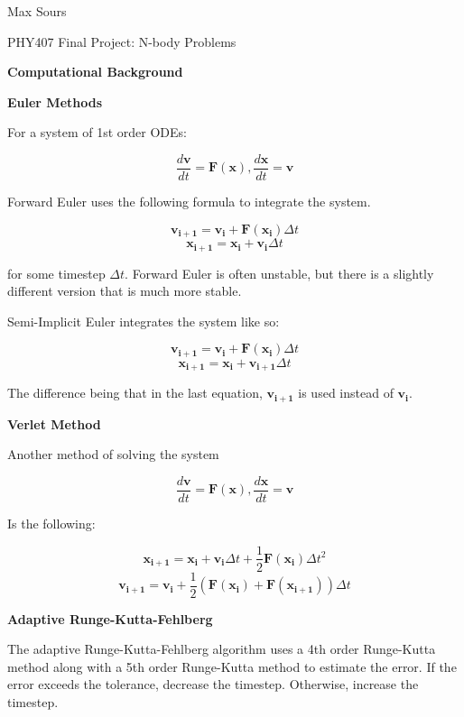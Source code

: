 \documentclass{article}
\begin{document}
\large %


{\Large%
\hfill Max Sours}

\begin{center}
{\Large PHY407 Final Project: N-body Problems} %
\end{center}
\vspace{0.05in}

{\Large \textbf{Computational Background}}

\textbf{Euler Methods}

For a system of 1st order ODEs:

$$\frac{d\mathbf{v}}{dt} = \mathbf{F}(\mathbf{x}), \frac{d\mathbf{x}}{dt} = \mathbf{v}$$

Forward Euler uses the following formula to integrate the system.

$$\mathbf{v_{i+1}} = \mathbf{v_i} + \mathbf{F}(\mathbf{x_i})\Delta t$$
$$\mathbf{x_{i+1}} = \mathbf{x_i} + \mathbf{v_i}\Delta t$$

for some timestep $\Delta t$. Forward Euler is often unstable, but there is a slightly different version that is much more stable.

Semi-Implicit Euler integrates the system like so:

$$\mathbf{v_{i+1}} = \mathbf{v_i} + \mathbf{F}(\mathbf{x_i})\Delta t$$
$$\mathbf{x_{i+1}} = \mathbf{x_i} + \mathbf{v_{i+1}}\Delta t$$

The difference being that in the last equation, $\mathbf{v_{i+1}}$ is used instead of $\mathbf{v_i}$.

\textbf{Verlet Method}

Another method of solving the system

$$\frac{d\mathbf{v}}{dt} = \mathbf{F}(\mathbf{x}), \frac{d\mathbf{x}}{dt} = \mathbf{v}$$

Is the following:

$$\mathbf{x_{i + 1}} = \mathbf{x_i} + \mathbf{v_i} \Delta t + \frac{1}{2}\mathbf{F}(\mathbf{x_i}) \Delta t^2$$
$$\mathbf{v_{i + 1}} = \mathbf{v_i} + \frac{1}{2}(\mathbf{F}(\mathbf{x_i}) + \mathbf{F}(\mathbf{x_{i+1}}))\Delta t$$

\textbf{Adaptive Runge-Kutta-Fehlberg}

The adaptive Runge-Kutta-Fehlberg algorithm uses a 4th order Runge-Kutta method along with a 5th order Runge-Kutta method to estimate the error. If the error exceeds the tolerance, decrease the timestep. Otherwise, increase the timestep.
\end{document}
